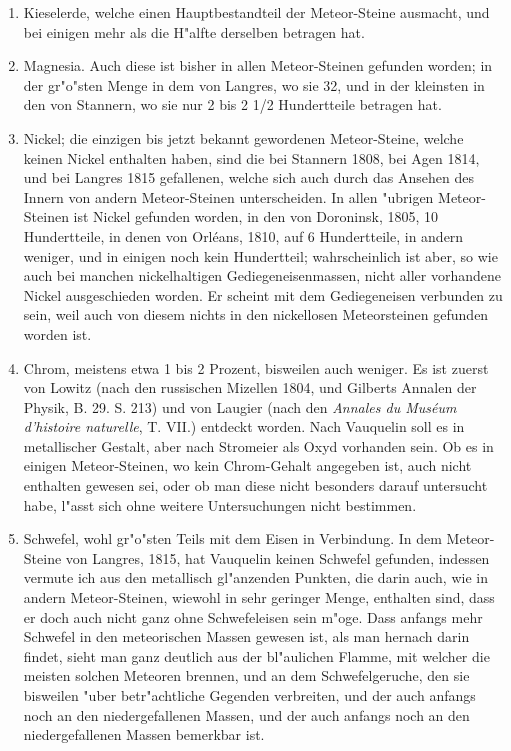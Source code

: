 \documentclass[a4paper, 11pt, oneside, polutonikogreek, german]{article}
\begin{document}
\begin{enumerate}
\begin{enumerate}
   \end{enumerate}
  \item Kieselerde, welche einen Hauptbestandteil der Meteor-Steine ausmacht, und bei einigen mehr als die H"alfte derselben betragen hat.
  \item Magnesia. Auch diese ist bisher in allen Meteor-Steinen gefunden worden; in der gr"o"sten Menge in dem von Langres, wo sie 32, und in der kleinsten in den von Stannern, wo sie nur 2 bis 2 1/2 Hundertteile betragen hat.
  \item Nickel; die einzigen bis jetzt bekannt gewordenen Meteor-Steine, welche keinen Nickel enthalten haben, sind die bei Stannern 1808, bei Agen 1814, und bei Langres 1815 gefallenen, welche sich auch durch das Ansehen des Innern von andern Meteor-Steinen unterscheiden. In allen "ubrigen Meteor-Steinen ist Nickel gefunden worden, in den von Doroninsk, 1805, 10 Hundertteile, in denen von Orléans, 1810, auf 6 Hundertteile, in andern weniger, und in einigen noch kein Hundertteil; wahrscheinlich ist aber, so wie auch bei manchen nickelhaltigen Gediegeneisenmassen, nicht aller vorhandene Nickel ausgeschieden worden. Er scheint mit dem Gediegeneisen verbunden zu sein, weil auch von diesem nichts in den nickellosen Meteorsteinen gefunden worden ist.
  \item Chrom, meistens etwa 1 bis 2 Prozent, bisweilen auch weniger. Es ist zuerst von Lowitz (nach den russischen Mizellen 1804, und Gilberts Annalen der Physik, B. 29. S. 213) und von Laugier (nach den \emph{Annales du Muséum d'histoire naturelle}, T. VII.) entdeckt worden. Nach Vauquelin soll es in metallischer Gestalt, aber nach Stromeier als Oxyd vorhanden sein. Ob es in einigen Meteor-Steinen, wo kein Chrom-Gehalt angegeben ist, auch nicht enthalten gewesen sei, oder ob man diese nicht besonders darauf untersucht habe, l"asst sich ohne weitere Untersuchungen nicht bestimmen.
  \item Schwefel, wohl gr"o"sten Teils mit dem Eisen in Verbindung. In dem Meteor-Steine von Langres, 1815, hat Vauquelin keinen Schwefel gefunden, indessen vermute ich aus den metallisch gl"anzenden Punkten, die darin auch, wie in andern Meteor-Steinen, wiewohl in sehr geringer Menge, enthalten sind, dass er doch auch nicht ganz ohne Schwefeleisen sein m"oge. Dass anfangs mehr Schwefel in den meteorischen Massen gewesen ist, als man hernach darin findet, sieht man ganz deutlich aus der bl"aulichen Flamme, mit welcher die meisten solchen Meteoren brennen, und an dem Schwefelgeruche, den sie bisweilen "uber betr"achtliche Gegenden verbreiten, und der auch anfangs noch an den niedergefallenen Massen, und der auch anfangs noch an den niedergefallenen Massen bemerkbar ist.

\end{enumerate}
\end{document}
